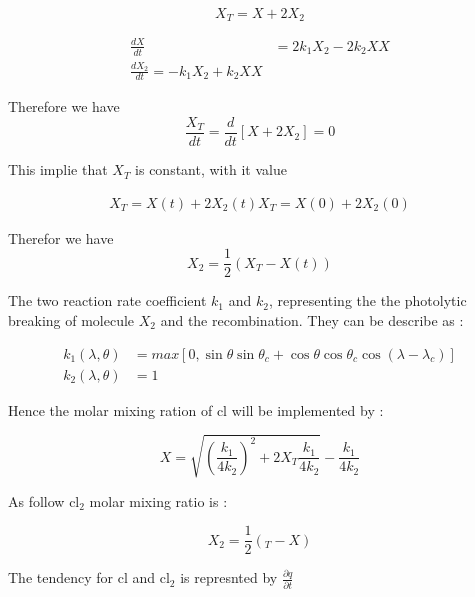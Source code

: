 \documentclass[times,doublespace]{fldauth}
\begin{document}
\begin{equation}
X_T=X+2X_2
\end{equation}

\begin{equation}
\begin{split}
\frac{dX}{dt}&=2k_1X_2-2k_2XX \\
\frac{dX_2}{dt}=-k_1X_2+k_2XX
\end{split}
\end{equation}

Therefore we have 
\begin{equation}
\frac{X_T}{dt}= \frac{d}{dt}[X+2X_2]=0
\end{equation}

This implie that $X_T$ is constant, with it value

\begin{equation}
\begin{split}
X_T=X(t)+2X_2(t)
X_T=X(0)+2X_2(0)
\end{split}
\end{equation}

Therefor we have
\begin{equation}
X_2=\frac{1}{2}(X_T-X(t))
\end{equation}

The two reaction rate coefficient  $k_1$ and $k_2$, representing the the photolytic breaking of molecule $X_2$ and the recombination. They can be describe as : 

\begin {equation}
\begin{split}
k_1(\lambda,\theta)&= max[0,\sin\theta\sin\theta_c+\cos\theta\cos\theta_c
\cos(\lambda-\lambda_c)] \\
k_2(\lambda,\theta)&=1
\end{split}
\end{equation}

Hence the molar mixing ration of cl will be implemented by :

\begin{equation}
X=\sqrt{\left(\frac{k_1}{4 k_2}\right)^2+2 X_T \frac{k_1}{4k_2} } - \frac{k_1}{4k_2}
\end{equation}

As follow $\text{cl}_2$ molar mixing ratio is :

\begin{equation}
X_2=\frac{1}{2}(_T-X)
\end{equation}

The tendency for cl and $\text{cl}_2$ is represnted by $ \frac{\partial q}{\partial t}$
\end{document}
